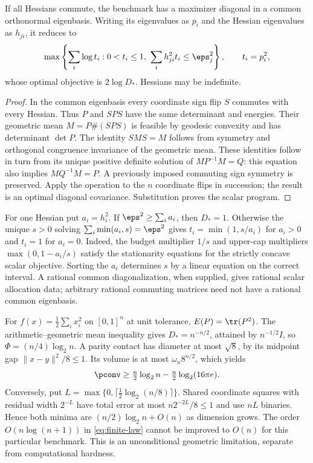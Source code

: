 \begin{proposition}\label{prop:commuting-covariance}
If all Hessians commute, the benchmark has a maximizer diagonal in a
common orthonormal eigenbasis. Writing its eigenvalues as $p_i$ and the
Hessian eigenvalues as $h_{ji}$, it reduces to
\[
 \max\left\{\sum_i\log t_i:0<t_i\le1,
                   \ \sum_i h_{ji}^2t_i\le\eps_j^2\right\},
 \qquad t_i=p_i^2,
\]
whose optimal objective is $2\log D_*$. Hessians may be indefinite.
\end{proposition}
\begin{proof}
In the common eigenbasis every coordinate sign flip $S$ commutes with
every Hessian. Thus $P$ and $SPS$ have the same determinant and energies.
Their geometric mean $M=P\#(SPS)$ is feasible by geodesic convexity and
has determinant $\det P$. The identity $SMS=M$ follows from symmetry
and orthogonal congruence invariance of the geometric mean. These
identities follow in turn from its unique positive definite solution of
$MP^{-1}M=Q$: this equation also implies $MQ^{-1}M=P$.
A previously imposed commuting sign symmetry is preserved. Apply the
operation to the $n$ coordinate flips in succession; the result is
an optimal diagonal covariance. Substitution proves the scalar program.
\end{proof}

For one Hessian put $a_i=h_i^2$. If $\eps^2\ge\sum_i a_i$, then
$D_*=1$. Otherwise the unique $s>0$ solving
$\sum_i\min(a_i,s)=\eps^2$ gives
$t_i=\min(1,s/a_i)$ for $a_i>0$ and $t_i=1$ for $a_i=0$.
Indeed, the budget multiplier $1/s$ and upper-cap multipliers
$\max(0,1-a_i/s)$ satisfy the stationarity equations for the strictly
concave scalar objective. Sorting the $a_i$ determines $s$ by a linear
equation on the correct interval. A rational common diagonalization,
when supplied, gives rational scalar allocation data; arbitrary rational
commuting matrices need not have a rational common eigenbasis.

\begin{example}\label{ex:covariance-gap}
For $f(x)=\frac12\sum_i x_i^2$ on $[0,1]^n$ at unit tolerance,
$E(P)=\tr(P^2)$. The arithmetic--geometric mean inequality gives
$D_*=n^{-n/2}$, attained by $n^{-1/2}I$, so
$\Phi=(n/4)\log_2n$. A parity contact has diameter at most $\sqrt8$,
by its midpoint gap $\|x-y\|^2/8\le1$. Its volume is at most
$\omega_n8^{n/2}$, which yields
\[
 \pconv\ge\tfrac n2\log_2n-\tfrac n2\log_2(16\pi e).
\]
Conversely, put $L=\max\{0,\lceil\frac12\log_2(n/8)\rceil\}$.
Shared coordinate squares with residual width $2^{-L}$ have total
error at most $n2^{-2L}/8\le1$ and use $nL$ binaries. Hence both
minima are $(n/2)\log_2n+O(n)$ as dimension grows. The order
$O(n\log(n+1))$ in \eqref{eq:finite-law} cannot be improved to $O(n)$
for this particular benchmark. This is an unconditional geometric
limitation, separate from computational hardness.
\end{example}

